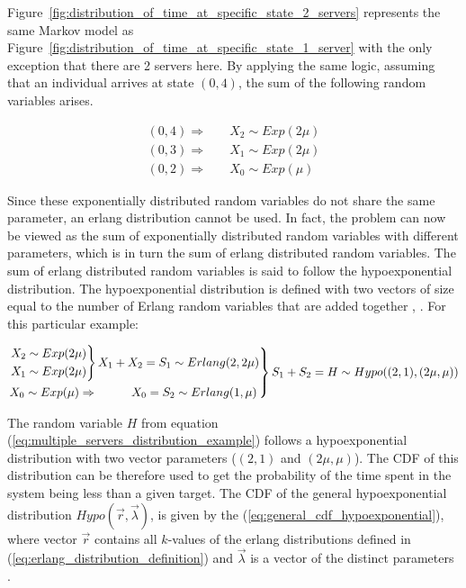 Figure~\ref{fig:distribution_of_time_at_specific_state_2_servers} represents the
same Markov model as
Figure~\ref{fig:distribution_of_time_at_specific_state_1_server} with the only
exception that there are 2 servers here.
By applying the same logic, assuming that an individual arrives at state
\((0,4)\), the sum of the following random variables arises.

\begin{align}
    (0,4) \Rightarrow \quad & X_2 \sim Exp(2\mu) \nonumber \\
    (0,3) \Rightarrow \quad & X_1 \sim Exp(2\mu) \\
    (0,2) \Rightarrow \quad & X_0 \sim Exp(\mu) \nonumber
\end{align}

Since these exponentially distributed random variables do not share the same
parameter, an erlang distribution cannot be used.
In fact, the problem can now be viewed as the sum of exponentially
distributed random variables with different parameters, which is in turn the
sum of erlang distributed random variables.
The sum of erlang distributed random variables is said to follow the
hypoexponential distribution.
The hypoexponential distribution is defined with two vectors of size equal
to the number of Erlang random variables that are added together
\cite{Akkouchi2008}, \cite{Smaili2013}.
For this particular example:

\footnotesize
\begin{align} \label{eq:multiple_servers_distribution_example}
    \begin{rcases}
        \begin{rcases}
            X_2 \sim Exp(2\mu) \\
            X_1 \sim Exp(2\mu)
        \end{rcases}
        X_1 + X_2 = S_1 \sim Erlang(2, 2\mu) \\
        X_0 \sim Exp(\mu) \Rightarrow \hspace{1cm} X_0 = S_2 \sim Erlang(1, \mu)
    \end{rcases}
    S_1 + S_2 = H \sim Hypo((2,1), (2\mu, \mu))
\end{align}
\normalsize

The random variable \(H\) from equation
(\ref{eq:multiple_servers_distribution_example}) follows a hypoexponential
distribution with two vector parameters (\((2,1)\) and \((2\mu, \mu)\)).
The CDF of this distribution can be therefore used to get the probability of the
time spent in the system being less than a given target.
The CDF of the general hypoexponential distribution \(Hypo(\vec{r},
\vec{\lambda})\), is given by the (\ref{eq:general_cdf_hypoexponential}), where
vector \(\vec{r}\) contains all \(k\)-values of the erlang distributions
defined in (\ref{eq:erlang_distribution_definition}) and \(\vec{\lambda}\)
is a vector of the distinct parameters \cite{Favaro2010}.

